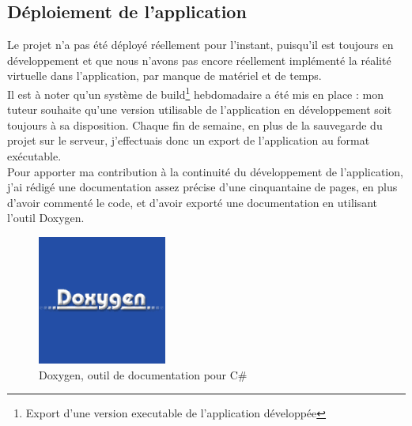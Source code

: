 \documentclass[a4paper]{article}
\begin{document}
    \vfill
    \newpage

    \subsection{Déploiement de l'application}
   
    Le projet n'a pas été déployé réellement pour l'instant, puisqu'il est toujours en développement et que nous n'avons pas encore réellement implémenté la réalité virtuelle dans l'application, par manque de matériel et de temps. \\

    Il est à noter qu'un système de build\footnote{Export d'une version executable de l'application développée} hebdomadaire a été mis en place : mon tuteur souhaite qu'une version utilisable de l'application en développement soit toujours à sa disposition. Chaque fin de semaine, en plus de la sauvegarde du projet sur le serveur, j'effectuais donc un export de l'application au format exécutable. \\
    
    Pour apporter ma contribution à la continuité du développement de l'application, j'ai rédigé une documentation assez précise d'une cinquantaine de pages, en plus d'avoir commenté le code, et d'avoir exporté une documentation en utilisant l'outil Doxygen. \\

    \begin{figure}[H]
        \centering
        \includegraphics{img/logo-doxygen}
        \caption{Doxygen, outil de documentation pour C\#}
    \end{figure}
\end{document}
